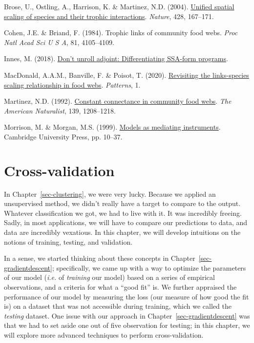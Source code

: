 \documentclass[
  letterpaper,
]{scrbook}
\newlength{\cslhangindent}
\newenvironment{CSLReferences}[2] %
 {\begin{list}{}{%
  \setlength{\itemindent}{0pt}
  \setlength{\leftmargin}{0pt}
  \setlength{\parsep}{0pt}
  \ifodd #1
   \setlength{\leftmargin}{\cslhangindent}
   \setlength{\itemindent}{-1\cslhangindent}
  \fi
  \setlength{\itemsep}{#2\baselineskip}}}
 {\end{list}}
\begin{document}
\label{refs-3}
\begin{CSLReferences}{1}{0}
Brose, U., Ostling, A., Harrison, K. \& Martinez, N.D. (2004).
\href{https://doi.org/10.1038/nature02297}{Unified spatial scaling of
species and their trophic interactions}. \emph{Nature}, 428, 167--171.

Cohen, J.E. \& Briand, F. (1984). Trophic links of community food webs.
\emph{Proc Natl Acad Sci U S A}, 81, 4105--4109.

Innes, M. (2018). \href{https://doi.org/10.48550/ARXIV.1810.07951}{Don't
unroll adjoint: Differentiating SSA-form programs}.

MacDonald, A.A.M., Banville, F. \& Poisot, T. (2020).
\href{https://doi.org/10.1016/j.patter.2020.100079}{Revisiting the
links-species scaling relationship in food webs}. \emph{Patterns}, 1.

Martinez, N.D. (1992).
\href{http://www.jstor.org/stable/2462337}{Constant connectance in
community food webs}. \emph{The American Naturalist}, 139, 1208--1218.

Morrison, M. \& Morgan, M.S. (1999).
\href{https://doi.org/10.1017/cbo9780511660108.003}{Models as mediating
instruments}. Cambridge University Press, pp. 10--37.

\end{CSLReferences}


\chapter{Cross-validation}\label{sec-crossvalidation}

In Chapter~\ref{sec-clustering}, we were very lucky. Because we applied
an unsupervised method, we didn't really have a target to compare to the
output. Whatever classification we got, we had to live with it. It was
incredibly freeing. Sadly, in most applications, we will have to compare
our predictions to data, and data are incredibly vexatious. In this
chapter, we will develop intuitions on the notions of training, testing,
and validation.

In a sense, we started thinking about these concepts in
Chapter~\ref{sec-gradientdescent}; specifically, we came up with a way
to optimize the parameters of our model (\emph{i.e.} of \emph{training}
our model) based on a series of empirical observations, and a criteria
for what a ``good fit'' is. We further appraised the performance of our
model by measuring the loss (our measure of how good the fit is) on a
dataset that was not accessible during training, which we called the
\emph{testing} dataset. One issue with our approach in
Chapter~\ref{sec-gradientdescent} was that we had to set aside one out
of five observation for testing; in this chapter, we will explore more
advanced techniques to perform cross-validation.
\end{document}
